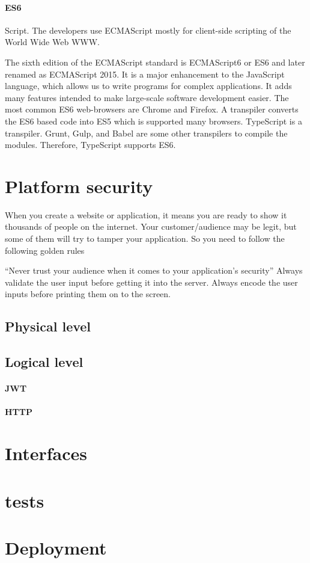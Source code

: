 \paragraph{ES6}
Script. The developers use ECMAScript mostly for client-side scripting of the World Wide Web \ac{WWW}.

The sixth edition of the ECMAScript standard is ECMAScript6 or ES6 and later renamed as ECMAScript 2015. It is a major enhancement to the JavaScript language, which allows us to write programs for complex applications. It adds many features intended to make large-scale software development easier. The most common ES6 web-browsers are Chrome and Firefox. A transpiler converts the ES6 based code into ES5 which is supported many browsers. TypeScript is a transpiler. Grunt, Gulp, and Babel are some other transpilers to compile the modules. Therefore, TypeScript supports ES6.



\section{Platform security}
When you create a website or application, it means you are ready to show it thousands of people on the internet. Your customer/audience may be legit, but some of them will try to tamper your application. So you need to follow the following golden rules

“Never trust your audience when it comes to your application’s security”
Always validate the user input before getting it into the server.
Always encode the user inputs before printing them on to the screen.
\subsection{Physical level}
\subsection{Logical level}
\paragraph{JWT}
\paragraph{HTTP}


\section{Interfaces}

\section{tests}


\section{Deployment}

